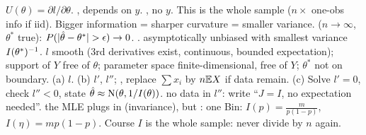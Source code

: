 \sk{} $U(\theta)=\partial l/\partial\theta$.  , depends on $y$.  , no $y$. This is the whole sample ($n\times$ one-obs info if iid). Bigger information = sharper curvature = smaller variance.
\sk{} ($n\to\infty$, $\theta^*$ true):  $P(|\hth-\theta^*|>\epsilon)\to0$.  .  asymptotically unbiased with smallest variance $I(\theta^*)^{-1}$.
\sk{} $l$ smooth (3rd derivatives exist, continuous, bounded expectation); support of $Y$ free of $\theta$; parameter space finite-dimensional, free of $Y$; $\theta^*$ not on boundary.
\sk{} (a) $l$. (b) $l'$, $l''$; , replace $\sum x_i$ by $n\mathbb{E} X$ if data remain. (c) Solve $l'=0$, check $l''<0$, state $\hat{\theta}\approx\mathrm{N}(\theta,1/I(\theta))$.
\sk{} no data in $l''$: write “$J=I$, no expectation needed”.  the MLE plugs in (invariance), but : one Bin: $I(p)=\frac m{p(1-p)}$, $I(\eta)=mp(1-p)$. Course $I$ is the whole sample: never divide by $n$ again.
